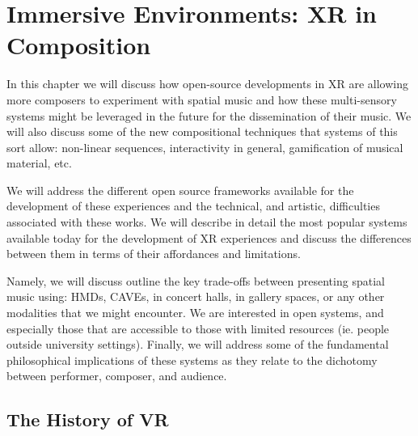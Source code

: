 \chapter{Immersive Environments: XR in Composition}
\label{ch:xr-mus}





In this chapter we will discuss how open-source developments in XR are allowing more composers to experiment with spatial music and how these multi-sensory systems might be leveraged in the future for the dissemination of their music. We will also discuss some of the new compositional techniques that systems of this sort allow: non-linear sequences, interactivity in general, gamification of musical material, etc. 

We will address the different open source frameworks available for the development of these experiences and the technical, and artistic, difficulties associated with these works. We will describe in detail the most popular systems available today for the development of XR experiences and discuss the differences between them in terms of their affordances and limitations.

Namely, we will discuss outline the key trade-offs between presenting spatial music using: HMDs, CAVEs, in concert halls, in gallery spaces, or any other modalities that we might encounter. We are interested in open systems, and especially those that are accessible to those with limited resources (ie. people outside university settings). Finally, we will address some of the fundamental philosophical implications of these systems as they relate to the dichotomy between performer, composer, and audience. 

\section{The History of VR}

